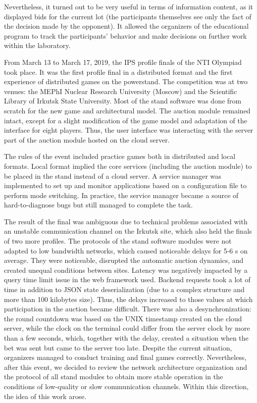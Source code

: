 \documentclass[
]{ceurart}
\begin{document}
Nevertheless, it turned out to be very useful in terms of information content, as it displayed bids for the current lot (the participants themselves see only the fact of the decision made by the opponent). It allowed the organizers of the educational program to track the participants' behavior and make decisions on further work within the laboratory.

From March 13 to March 17, 2019, the IPS profile finals of the NTI Olympiad took place. It was the first profile final in a distributed format and the first experience of distributed games on the powerstand. The competition was at two venues: the MEPhI Nuclear Research University (Moscow) and the Scientific Library of Irkutsk State University. Most of the stand software was done from scratch for the new game and architectural model. The auction module remained intact, except for a slight modification of the game model and adaptation of the interface for eight players. Thus, the user interface was interacting with the server part of the auction module hosted on the cloud server.

The rules of the event included practice games both in distributed and local formats. Local format implied the core services (including the auction module) to be placed in the stand instead of a cloud server. A service manager was implemented to set up and monitor applications based on a configuration file to perform mode switching. In practice, the service manager became a source of hard-to-diagnose bugs but still managed to complete the task.

The result of the final was ambiguous due to technical problems associated with an unstable communication channel on the Irkutsk site, which also held the finals of two more profiles. The protocols of the stand software modules were not adapted to low bandwidth networks, which caused noticeable delays for 5-6 s on average. They were noticeable, disrupted the automatic auction dynamics, and created unequal conditions between sites. Latency was negatively impacted by a query time limit issue in the web framework used. Backend requests took a lot of time in addition to JSON state deserialization (due to a complex structure and more than 100 kilobytes size). Thus, the delays increased to those values ​​at which participation in the auction became difficult. There was also a desynchronization: the round countdown was based on the UNIX timestamp created on the cloud server, while the clock on the terminal could differ from the server clock by more than a few seconds, which, together with the delay, created a situation when the bet was sent but came to the server too late. Despite the current situation, organizers managed to conduct training and final games correctly. Nevertheless, after this event, we decided to review the network architecture organization and the protocol of all stand modules to obtain more stable operation in the conditions of low-quality or slow communication channels. Within this direction, the idea of ​​this work arose.
\end{document}
